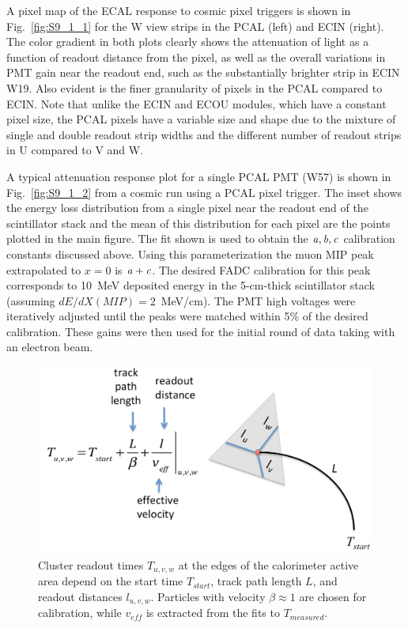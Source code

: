 A pixel map of the ECAL response to cosmic pixel triggers is shown in Fig.~\ref{fig:S9_1_1} for the W view strips
in the PCAL (left) and ECIN (right). The color gradient in both plots clearly shows the attenuation of light as a
function of readout distance from the pixel, as well as the overall variations in PMT gain near the readout end, such
as the substantially brighter strip in ECIN W19. Also evident is the finer granularity of pixels in the PCAL compared
to ECIN. Note that unlike the ECIN and ECOU modules, which have a constant pixel size, the PCAL pixels have a
variable size and shape due to the mixture of single and double readout strip widths and the different number of
readout strips in U compared to V and W. 

A typical attenuation response plot for a single PCAL PMT (W57) is shown in Fig.~\ref{fig:S9_1_2} from a cosmic
run using a PCAL pixel trigger. The inset shows the energy loss distribution from a single pixel near the readout
end of the scintillator stack and the mean of this distribution for each pixel are the points plotted in the main
figure. The fit shown is used to obtain the ${\it a,b,c}$ calibration constants discussed above. Using this
parameterization the muon MIP peak extrapolated to $x=0$ is ${\it a+c}$. The desired FADC calibration for this
peak corresponds to 10~MeV deposited energy in the 5-cm-thick scintillator stack (assuming
$dE/dX(MIP)=2$~MeV/cm). The PMT high voltages were iteratively adjusted until the peaks were matched within
5\% of the desired calibration. These gains were then used for the initial round of data taking with an electron beam.

\begin{figure}[hbt]
\centering
\includegraphics[width=1.0\columnwidth,keepaspectratio]{img/S9_2_0.png}
\caption[]{Cluster readout times $T_{u,v,w}$ at the edges of the calorimeter active area depend on the start time
  $T_{start}$, track path length $L$, and readout distances $l_{u,v,w}$. Particles with velocity $\beta\approx 1$ are
  chosen for calibration, while $v_{eff}$ is extracted from the fits to $T_{measured}$.}
\label{fig:S9_2_0}
\end{figure}

